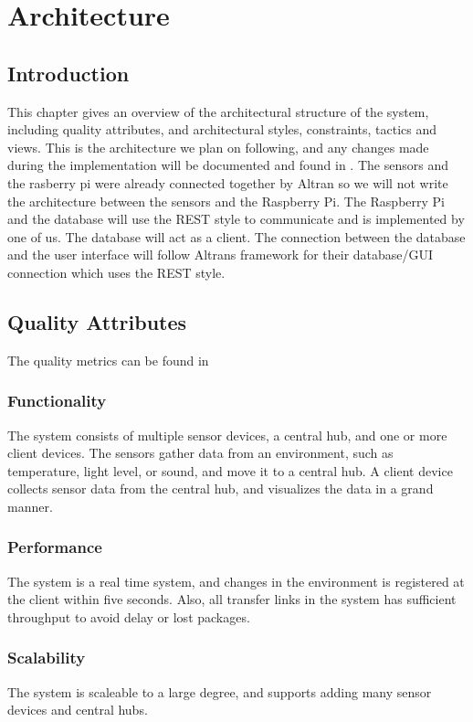 \documentclass[../document.tex]{subfiles}
\begin{document}
\section{Architecture}
\label{architecture}
\subsection{Introduction}
This chapter gives an overview of the architectural structure of the system, including quality attributes, and architectural styles, constraints, tactics and views. This is the architecture we plan on following, and any changes made during the implementation will be documented and found in . The sensors and the rasberry pi were already connected together by \gls{Altran} so we will not write the architecture between the sensors and the \gls{Raspberry Pi}. The \gls{Raspberry Pi} and the database will use the \gls{REST} style to communicate and is implemented by one of us. The database will act as a client. The connection between the database and the user interface will follow Altrans framework for their database/GUI connection which uses the \gls{REST} style.

\subsection{Quality Attributes}
\label{quality_attributes}
The quality metrics can be found in 

\subsubsection{Functionality}
The system consists of multiple sensor devices, a central hub, and one or more client devices. The sensors gather data from an environment, such as temperature, light level, or sound, and move it to a central hub. A client device collects sensor data from the central hub, and visualizes the data in a grand manner.

\subsubsection{Performance}
The system is a real time system, and changes in the environment is registered at the client within five seconds. Also, all transfer links in the system has sufficient throughput to avoid delay or lost packages.

\subsubsection{Scalability}
The system is scaleable to a large degree, and supports adding many sensor devices and central hubs.
\end{document}
